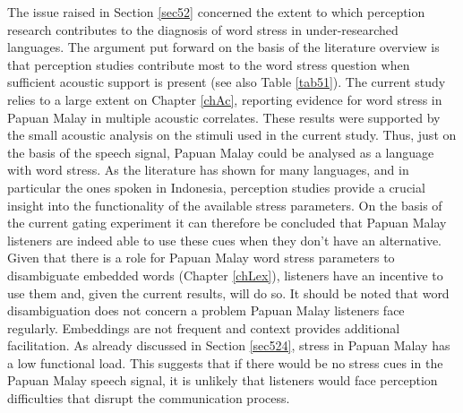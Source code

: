 The issue raised in Section \ref{sec52} concerned the extent to which perception research contributes to the diagnosis of word stress in under-researched languages. The argument put forward on the basis of the literature overview is that perception studies contribute most to the word stress question when sufficient acoustic support is present (see also Table \ref{tab51}). The current study relies to a large extent on Chapter \ref{chAc}, reporting evidence for word stress in Papuan Malay in multiple acoustic correlates. These results were supported by the small acoustic analysis on the stimuli used in the current study. Thus, just on the basis of the speech signal, Papuan Malay could be analysed as a language with word stress. As the literature has shown for many languages, and in particular the ones spoken in Indonesia, perception studies provide a crucial insight into the functionality of the available stress parameters. On the basis of the current gating experiment it can therefore be concluded that Papuan Malay listeners are indeed able to use these cues when they don’t have an alternative. Given that there is a role for Papuan Malay word stress parameters to disambiguate embedded words (Chapter \ref{chLex}), listeners have an incentive to use them and, given the current results, will do so. It should be noted that word disambiguation does not concern a problem Papuan Malay listeners face regularly. Embeddings are not frequent and context provides additional facilitation. As already discussed in Section \ref{sec524}, stress in Papuan Malay has a low functional load. This suggests that if there would be no stress cues in the Papuan Malay speech signal, it is unlikely that listeners would face perception difficulties that disrupt the communication process.\par

